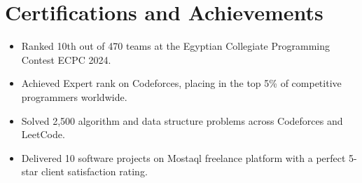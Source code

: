 \documentclass[letterpaper,10pt]{article}
\begin{document}
\section{Certifications and Achievements}

\begin{itemize}
  \item Ranked 10th out of 470 teams at the Egyptian Collegiate Programming Contest ECPC 2024.
  \item Achieved Expert rank on Codeforces, placing in the top 5\% of competitive programmers worldwide.
  \item Solved 2,500 algorithm and data structure problems across Codeforces and LeetCode.
  \item Delivered 10 software projects on Mostaql freelance platform with a perfect 5-star client satisfaction rating.
\end{itemize}
\end{document}
